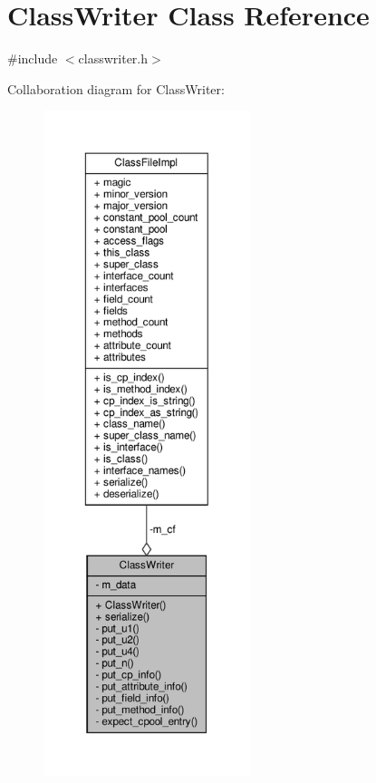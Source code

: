 \hypertarget{classClassWriter}{}\section{Class\+Writer Class Reference}
\label{classClassWriter}


{\ttfamily \#include $<$classwriter.\+h$>$}



Collaboration diagram for Class\+Writer\+:
\nopagebreak
\begin{figure}[H]
\begin{center}
\leavevmode
\includegraphics[height=550pt]{classClassWriter__coll__graph}
\end{center}
\end{figure}
